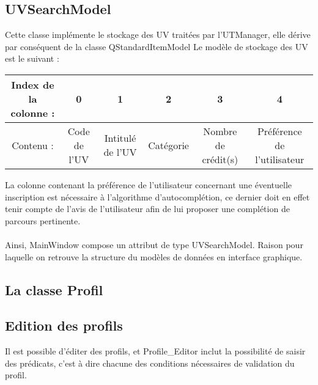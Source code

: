 \documentclass[a4paper,10pt,french]{report}
\begin{document}
	
	
	\subsection{UVSearchModel}\label{subsec:UVSearchModel}
	
	Cette classe implémente le stockage des UV traitées par l'UTManager, elle dérive par conséquent de la classe QStandardItemModel
	Le modèle de stockage des UV est le suivant :
	
	\begin{tabular}{|c||c|c|c|c|c|}
	\hline
	Index de la colonne :  & 0 & 1 & 2 & 3 & 4 \\ \hline
	Contenu : & Code de l'UV & Intitulé de l'UV & Catégorie & Nombre de crédit(s) & Préférence de l'utilisateur \\
	\hline
	\end{tabular}
	
	La colonne contenant la préférence de l'utilisateur concernant une éventuelle inscription est nécessaire à l'algorithme d'autocomplétion, ce dernier doit en effet tenir compte de l'avis de l'utilisateur afin de lui proposer une complétion de parcours pertinente.\\\\
    
    Ainsi, MainWindow compose un attribut de type UVSearchModel. %
    Raison pour laquelle on retrouve la structure du modèles de données en interface graphique.
    
	
	\subsection{La classe Profil}\label{subsec:Profil}
		
	
	
		\subsubsection{}
    \subsection{Edition des profils}\label{subsec:Edition des profils}
        Il est possible d'éditer des profils, et Profile\_Editor inclut la possibilité de saisir des prédicats, c'est à dire chacune des conditions nécessaires de validation du profil.
        
\end{document}
